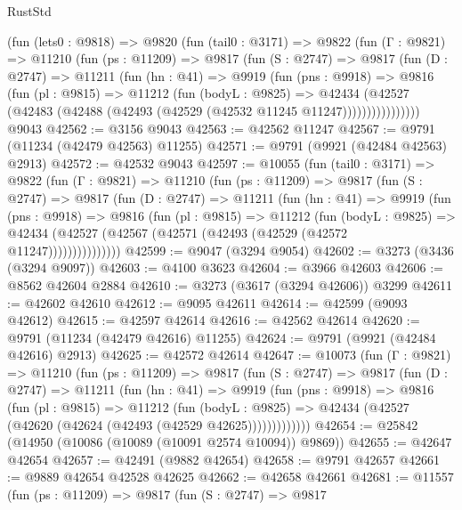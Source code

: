 \begin{lexlean}{RustStd}
\begin{coremodule}
    (fun (lets0 : @9818) =>
    @9820
      (fun (tail0 : @3171) =>
      @9822
        (fun (Γ : @9821) =>
        @11210
          (fun (ps : @11209) =>
          @9817
            (fun (S : @2747) =>
            @9817
              (fun (D : @2747) =>
              @11211
                (fun (hn : @41) =>
                @9919
                  (fun (pns : @9918) =>
                  @9816
                    (fun (pl : @9815) =>
                    @11212
                      (fun (bodyL : @9825) =>
                      @42434
                        (@42527
                          (@42483 (@42488 (@42493 (@42529 (@42532 @11245 @11247))))))))))))))))
    @9043
@42562 := @3156 @9043
@42563 := @42562 @11247
@42567 := @9791 (@11234 (@42479 @42563) @11255)
@42571 := @9791 (@9921 (@42484 @42563) @2913)
@42572 := @42532 @9043
@42597 := @10055
    (fun (tail0 : @3171) =>
    @9822
      (fun (Γ : @9821) =>
      @11210
        (fun (ps : @11209) =>
        @9817
          (fun (S : @2747) =>
          @9817
            (fun (D : @2747) =>
            @11211
              (fun (hn : @41) =>
              @9919
                (fun (pns : @9918) =>
                @9816
                  (fun (pl : @9815) =>
                  @11212
                    (fun (bodyL : @9825) =>
                    @42434 (@42527 (@42567 (@42571 (@42493 (@42529 (@42572 @11247)))))))))))))))
@42599 := @9047 (@3294 @9054)
@42602 := @3273 (@3436 (@3294 @9097))
@42603 := @4100 @3623
@42604 := @3966 @42603
@42606 := @8562 @42604 @2884
@42610 := @3273 (@3617 (@3294 @42606)) @3299
@42611 := @42602 @42610
@42612 := @9095 @42611
@42614 := @42599 (@9093 @42612)
@42615 := @42597 @42614
@42616 := @42562 @42614
@42620 := @9791 (@11234 (@42479 @42616) @11255)
@42624 := @9791 (@9921 (@42484 @42616) @2913)
@42625 := @42572 @42614
@42647 := @10073
    (fun (Γ : @9821) =>
    @11210
      (fun (ps : @11209) =>
      @9817
        (fun (S : @2747) =>
        @9817
          (fun (D : @2747) =>
          @11211
            (fun (hn : @41) =>
            @9919
              (fun (pns : @9918) =>
              @9816
                (fun (pl : @9815) =>
                @11212
                  (fun (bodyL : @9825) =>
                  @42434 (@42527 (@42620 (@42624 (@42493 (@42529 @42625)))))))))))))
@42654 := @25842 (@14950 (@10086 (@10089 (@10091 @2574 @10094)) @9869))
@42655 := @42647 @42654
@42657 := @42491 (@9882 @42654)
@42658 := @9791 @42657
@42661 := @9889 @42654 @42528 @42625
@42662 := @42658 @42661
@42681 := @11557
    (fun (ps : @11209) =>
    @9817
      (fun (S : @2747) =>
      @9817

\end{coremodule}
\end{lexlean}
